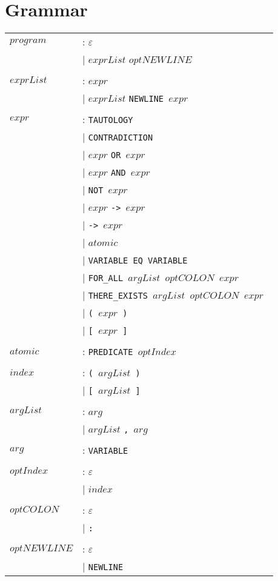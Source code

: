 \section{Grammar}
\label{sec:appendix_parser}

	\begin{tabular}{ll}
	$program$ & :    $\varepsilon$ \\
	{} & $\mid$      $exprList$ $optNEWLINE$ \\
	\\

	$exprList$ & :   $expr$ \\
	{} & $\mid$      $exprList$ \tt{NEWLINE} $expr$ \\
	\\

	$expr$ & :       \tt{TAUTOLOGY} \\
	{} & $\mid$      \tt{CONTRADICTION} \\
	{} & $\mid$      $expr$ \tt{OR} $expr$ \\
	{} & $\mid$      $expr$ \tt{AND} $expr$ \\
	{} & $\mid$      \tt{NOT} $expr$ \\
	{} & $\mid$      $expr$ \tt{->} $expr$ \\
	{} & $\mid$      \tt{->} $expr$ \\
	{} & $\mid$      $atomic$ \\
	{} & $\mid$      \tt{VARIABLE EQ VARIABLE} \\
	{} & $\mid$      \tt{FOR\_ALL} $argList$ $optCOLON$ $expr$ \\
	{} & $\mid$      \tt{THERE\_EXISTS} $argList$ $optCOLON$ $expr$ \\
	{} & $\mid$      \tt{(} $expr$ \tt{)} \\
	{} & $\mid$      \tt{[} $expr$ \tt{]} \\
	\\

	$atomic$ & :     \tt{PREDICATE} $optIndex$ \\
	\\

	$index$ & :      \tt{(} $argList$ \tt{)} \\
	{} & $\mid$      \tt{[} $argList$ \tt{]} \\
	\\

	$argList$ & :    $arg$ \\
	{} & $\mid$      $argList$ \tt{,} $arg$ \\
	\\

	$arg$ & :        \tt{VARIABLE} \\
	\\

	$optIndex$ & :   $\varepsilon$ \\
	{} & $\mid$      $index$ \\
	\\

	$optCOLON$ & :   $\varepsilon$ \\
	{} & $\mid$      \tt{:} \\
	\\

	$optNEWLINE$ & : $\varepsilon$ \\
	{} & $\mid$      \tt{NEWLINE}
	\end{tabular}
